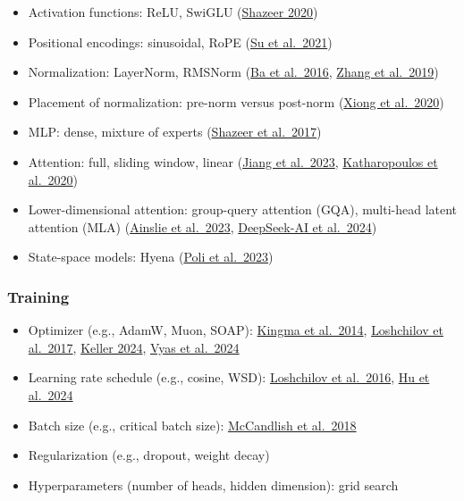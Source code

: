 \vspace{1em}
\begin{itemize}[leftmargin=0em]
  \item Activation functions: ReLU, SwiGLU (\href{https://arxiv.org/pdf/2002.05202.pdf}{Shazeer 2020})
  \item Positional encodings: sinusoidal, RoPE (\href{https://arxiv.org/pdf/2104.09864.pdf}{Su et al.\ 2021})
  \item Normalization: LayerNorm, RMSNorm (\href{https://arxiv.org/pdf/1607.06450.pdf}{Ba et al.\ 2016}, \href{https://arxiv.org/abs/1910.07467}{Zhang et al.\ 2019})
  \item Placement of normalization: pre-norm versus post-norm (\href{https://arxiv.org/pdf/2002.04745.pdf}{Xiong et al.\ 2020})
  \item MLP: dense, mixture of experts (\href{https://arxiv.org/pdf/1701.06538.pdf}{Shazeer et al.\ 2017})
  
  \item Attention: full, sliding window, linear (\href{https://arxiv.org/pdf/2310.06825.pdf}{Jiang et al.\ 2023}, \href{https://arxiv.org/abs/2006.16236}{Katharopoulos et al.\ 2020})
  \item Lower-dimensional attention: group-query attention (GQA), multi-head latent attention (MLA) (\href{https://arxiv.org/pdf/2305.13245.pdf}{Ainslie et al.\ 2023}, \href{https://arxiv.org/abs/2405.04434}{DeepSeek-AI et al.\ 2024})
  \item State-space models: Hyena (\href{https://arxiv.org/abs/2302.10866}{Poli et al.\ 2023})
\end{itemize}

\subsubsection{Training}

\begin{itemize}[leftmargin=0em,label=\textbullet]
\item Optimizer (e.g., AdamW, Muon, SOAP):
\href{https://arxiv.org/abs/1412.6980}{Kingma et al.\ 2014},
\href{https://arxiv.org/abs/1711.05101}{Loshchilov et al.\ 2017},
\href{https://kellerjordan.github.io/posts/muon/}{Keller 2024},
\href{https://arxiv.org/abs/2409.11321}{Vyas et al.\ 2024}
\item Learning rate schedule (e.g., cosine, WSD):
\href{https://arxiv.org/pdf/1608.03983.pdf}{Loshchilov et al.\ 2016},
\href{https://arxiv.org/pdf/2404.06395}{Hu et al.\ 2024}
\item Batch size (e.g., critical batch size):
\href{https://arxiv.org/pdf/1812.06162.pdf}{McCandlish et al.\ 2018}
\item Regularization (e.g., dropout, weight decay)
\item Hyperparameters (number of heads, hidden dimension): grid search
\end{itemize}

